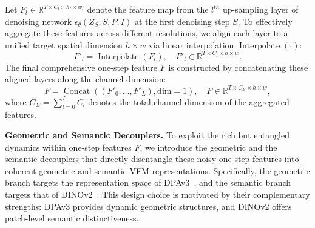 \documentclass[runningheads]{llncs}
\begin{document}
Let $F_l \in \mathbb{R}^{T \times C_l \times h_l \times w_l}$ denote the feature map from the $l^{th}$ up-sampling layer of denoising network $\epsilon_\theta(Z_{S},S,P,I)$ at the first denoising step $S$. To effectively aggregate these features across different resolutions, we align each layer to a unified target spatial dimension $h \times w$ via linear interpolation $\operatorname{Interpolate}(\cdot)$:
\begin{equation}
    F'_l = \operatorname{Interpolate}(F_l), \quad F'_l \in \mathbb{R}^{T \times C_l \times h \times w}.
\end{equation}
The final comprehensive one-step feature $F$ is constructed by concatenating these aligned layers along the channel dimension:
\begin{equation}
    F = \operatorname{Concat}((F'_0, \dots, F'_L), \text{dim}=1), \quad F \in \mathbb{R}^{T \times C_{\Sigma} \times h \times w},
\end{equation}
where $C_{\Sigma} = \sum_{l=0}^{L} C_{l}$ denotes the total channel dimension of the aggregated features.

\noindent \textbf{Geometric and Semantic Decouplers.}
To exploit the rich but entangled dynamics within one-step features $F$, we introduce the geometric and the semantic decouplers that directly disentangle these noisy one-step features into coherent geometric and semantic VFM representations. Specifically, the geometric branch targets the representation space of DPAv3~\cite{lin2025depth}, and the semantic branch targets that of DINOv2~\cite{oquab2023dinov2}. This design choice is motivated by their complementary strengths: DPAv3 provides dynamic geometric structures, and DINOv2 offers patch-level semantic distinctiveness.
\end{document}
